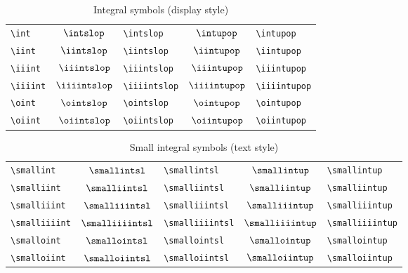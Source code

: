 \documentclass[captions=tableheading]{scrartcl}
\begin{document}
\begin{table}
  \caption{Integral symbols (display style)}
  \label{tab:integrals}
  \centering
  \begin{tabular}[c]{l@{\hskip 2em}cl@{\hskip 3em}cl}
    \toprule
    \verb|\int| &
    $\displaystyle\intslop$ & \verb|\intslop| &
    $\displaystyle\intupop$ & \verb|\intupop| \\
    \addlinespace
    \verb|\iint| &
    $\displaystyle\iintslop$ & \verb|\iintslop| &
    $\displaystyle\iintupop$ & \verb|\iintupop| \\
    \addlinespace
    \verb|\iiint| &
    $\displaystyle\iiintslop$ & \verb|\iiintslop| &
    $\displaystyle\iiintupop$ & \verb|\iiintupop| \\
    \addlinespace
    \verb|\iiiint| &
    $\displaystyle\iiiintslop$ & \verb|\iiiintslop| &
    $\displaystyle\iiiintupop$ & \verb|\iiiintupop| \\
    \addlinespace
    \verb|\oint| &
    $\displaystyle\ointslop$ & \verb|\ointslop| &
    $\displaystyle\ointupop$ & \verb|\ointupop| \\
    \addlinespace
    \verb|\oiint| &
    $\displaystyle\oiintslop$ & \verb|\oiintslop| &
    $\displaystyle\oiintupop$ & \verb|\oiintupop| \\
    \bottomrule
  \end{tabular}
\end{table}

\begin{table}
  \caption{Small integral symbols (text style)}
  \label{tab:small-integrals}
  \centering
  \begin{tabular}[c]{l@{\hskip 2em}cl@{\hskip 3em}cl}
    \toprule
    \verb|\smallint| &
    $\smallintsl$ & \verb|\smallintsl| &
    $\smallintup$ & \verb|\smallintup| \\
    \verb|\smalliint| &
    $\smalliintsl$ & \verb|\smalliintsl| &
    $\smalliintup$ & \verb|\smalliintup| \\
    \verb|\smalliiint| &
    $\smalliiintsl$ & \verb|\smalliiintsl| &
    $\smalliiintup$ & \verb|\smalliiintup| \\
    \verb|\smalliiiint| &
    $\smalliiiintsl$ & \verb|\smalliiiintsl| &
    $\smalliiiintup$ & \verb|\smalliiiintup| \\
    \verb|\smalloint| &
    $\smallointsl$ & \verb|\smallointsl| &
    $\smallointup$ & \verb|\smallointup| \\
    \verb|\smalloiint| &
    $\smalloiintsl$ & \verb|\smalloiintsl| &
    $\smalloiintup$ & \verb|\smalloiintup| \\
    \bottomrule
  \end{tabular}
\end{table}
\end{document}

